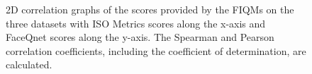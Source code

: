 \begin{figure}[h]
\centering
    \caption{2D correlation graphs of the scores provided by the FIQMs on the three datasets with ISO Metrics scores along the x-axis and FaceQnet scores along the y-axis. The Spearman and Pearson correlation coefficients, including the coefficient of determination, are calculated.}
    \label{fig:corrFIQMs}
\end{figure}


